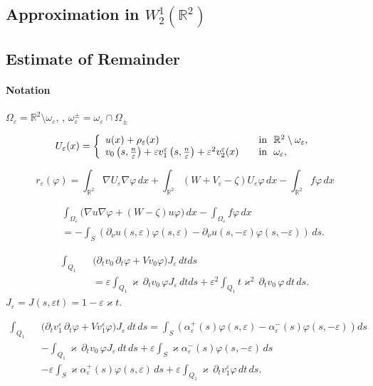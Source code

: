 \documentclass[graybox]{svmult}
\renewcommand{\kappa}{\varkappa}
\newcommand{\Real}{\mathbb R}
\newcommand{\eps}{\varepsilon}
\renewcommand{\phi}{\varphi}
\newcommand\nep{\textstyle\frac n\eps}
\begin{document}
\subsection{Approximation in $W_2^1(\Real^2)$}


\subsection{Estimate of Remainder}

\paragraph{Notation}

$\Omega_\eps=\Real^2\setminus\omega_\eps$, , $\omega_\eps^\pm=\omega_\eps\cap \Omega_\pm$

\begin{equation}\label{AsymptoticsUe}
U_\eps(x)=
\left\{
  \begin{array}{ll}
    u(x)+\rho_\eps(x)&\quad \hbox{in \ }\Real^2\setminus \omega_\eps, \\
    v_0\left(s,\nep\right)+\eps v_1^\eps\left(s,\nep\right)+\eps^2 v_2^\eps(x)
&\quad \hbox{in \ } \omega_\eps,
  \end{array}
\right.
\end{equation}







$$
r_\eps(\phi)=\int_{\Real^2}\nabla U_\eps \nabla \phi\,dx+
             \int_{\Real^2} (W+V_\eps-\zeta)U_\eps \phi\,dx
            -   \int_{\Real^2}f\phi\,dx
$$


\begin{eqnarray}\nonumber
&&\int_{\Omega_\eps}\big(\nabla u \nabla \phi+(W-\zeta)u\phi \big)\,dx-\int_{\Omega_\eps}f\phi\,dx\\\nonumber
&&=-\int_S (\partial_\nu u(s,\eps)\phi(s,\eps)-\partial_\nu u(s,-\eps)\phi(s,-\eps) )\,ds.
\end{eqnarray}



\begin{eqnarray}\nonumber
\int_{Q_1}&&\big(\partial_t v_0 \,\partial_t \phi
+Vv_0 \phi\big)J_\eps\,dt ds\\
&&=\eps \int_{Q_1} \kappa\,\partial_t v_0\, \phi J_\eps\,dt ds+\eps^2\int_{Q_1} t\kappa^2\,\partial_t v_0 \,\phi \,dt \,ds.
\end{eqnarray}
$J_\eps=J(s,\eps t)=1-\eps\kappa t$.

\begin{eqnarray}\nonumber
\int_{Q_1}&&\big(\partial_t v_1^\eps \,\partial_t \phi
+Vv_1^\eps \phi\big)J_\eps\,dt\, ds=\int_S\left(\alpha_\eps^+(s)\phi(s,\eps)-\alpha_\eps^-(s)\phi(s,-\eps)\right)ds\\\nonumber
&&-
\int_{Q_1}\kappa \,\partial_t v_0\, \phi J_\eps\,dt\, ds
+\eps \int_S \kappa\alpha_\eps^-(s)\phi(s,-\eps)\,ds
\\\nonumber
&&-
\eps \int_S \kappa\alpha_\eps^+(s)\phi(s,\eps)\,ds
+\eps\int_{Q_1}\kappa \,\partial_t v_1^\eps \phi\,dt\, ds.
\end{eqnarray}
\end{document}
